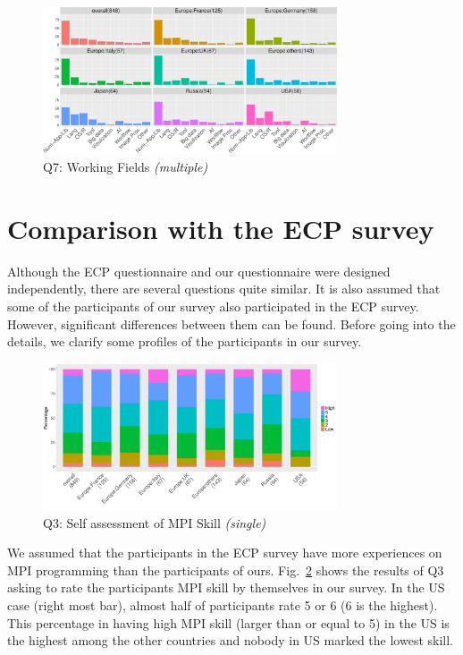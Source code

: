 \documentclass[preprint,5p,times]{elsarticle}
\begin{document}
\begin{figure}[htb]
  \begin{center}
    \includegraphics[width=8.7cm]{R-scripts/Q7.pdf}
    \caption{Q7: Working Fields {\it(multiple)}}
    \label{fig:working-fields}
  \end{center}
\end{figure}

\section{Comparison with the ECP survey}

Although the ECP questionnaire and our questionnaire were designed
independently, there are several questions quite similar. It is also
assumed that some of the participants of our survey
also participated in the ECP survey. However, significant differences
between them can be found. Before going into the details, we clarify
some profiles of the participants in our survey.

\begin{figure}[htb]
  \begin{center}
    \includegraphics[width=8.7cm]{R-scripts/Q3.pdf}
    \caption{Q3: Self assessment of MPI Skill {\it(single)}}
    \label{fig:mpi-skill}
  \end{center}
\end{figure}

We assumed that the participants in the ECP survey have more
experiences on MPI
programming than the participants of ours. Fig.~\ref{fig:mpi-skill}
shows the results of Q3 asking to rate the participants MPI skill by
themselves in our survey.  In the US case
(right most bar), almost half of participants rate 5 or 6
(6 is the highest). This percentage in having high MPI skill (larger
than or equal to 5) in the US is the highest among the other
countries and nobody in US marked the lowest skill.
\end{document}
